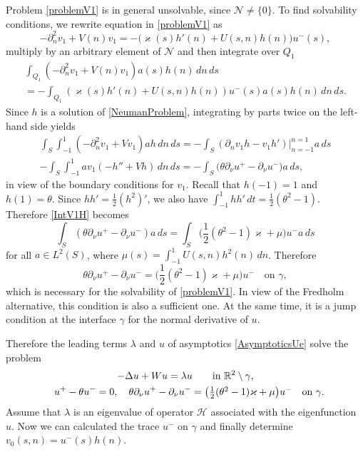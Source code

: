 \documentclass[reqno]{amsart}
\theoremstyle{plain}
\numberwithin{equation}{section}
\renewcommand{\kappa}{\varkappa}
\newcommand{\Real}{\mathbb R}
\newcommand{\cH}{\mathcal{H}}
\newcommand{\pte}{\partial_n}
\begin{document}
Problem \eqref{problemV1} is in general unsolvable, since $\mathcal{N}\neq\{0\}$.  To find solvabi\-li\-ty conditions, we rewrite  equation in \eqref{problemV1} as
\begin{equation}\label{eqnV1Expand}
  -\pte^2 v_1+V(n)v_1=-\big(\kappa(s)h'(n)+U(s,n)h(n)\big)u^-(s),
\end{equation}
multiply  by an arbitrary element of  $\mathcal{N}$  and then integrate over $Q_1$
\begin{multline}\label{IntV1H}
\int_{Q_1}\left(-\pte^2 v_1+V(n)v_1\right)a(s)h(n)\,dn\,ds
\\
=
-\int_{Q_1}(\kappa(s)h'(n)+U(s,n)h(n))u^-(s)a(s)h(n)\, dn\,ds.
\end{multline}
Since $h$ is a solution of \eqref{NeumanProblem}, integrating by parts twice on the left-hand side yields
\begin{multline*}
\int_{S} \int_{-1}^1\left(-\pte^2 v_1+Vv_1\right)a h\,dn \,ds
=-\int_{S}( \partial_n v_1 h-v_1 h')\big|_{n=-1}^{n=1}a\,ds\\-
\int_{S} \int_{-1}^1 a v_1\left(-h''+Vh\right)\,dn\,ds
=-\int_{S}\big(\theta\partial_\nu u^+-\partial_\nu u^-\big) a\,ds,
\end{multline*}
in view of the boundary conditions for $v_1$.
Recall that $h(-1)=1$ and $h(1)=\theta$.
Since $hh'=\frac12 (h^2)'$, we also have $\int_{-1}^1hh'\,d t=\textstyle\frac{1}{2 }(\theta^2-1)$.
Therefore \eqref{IntV1H} becomes
\begin{equation*}
\int_{S}\left(\theta\partial_\nu u^+-\partial_\nu u^-\right)a\,ds
=\int_{S}\big(\textstyle\frac{1}{2}(\theta^2-1)\kappa+\mu \big)u^-a\,ds
\end{equation*}
for all  $a\in L^2(S)$, where $\mu(s)=\int_{-1}^1 U(s,n)h^2(n)\, dn$.
Therefore
\begin{equation*}
  \theta\partial_\nu u^+-\partial_\nu u^-
=\big(\textstyle\frac{1}{2}(\theta^2-1)\kappa+\mu \big) u^-\quad\text {on }\gamma,
\end{equation*}
which is necessary for the solvability of \eqref{problemV1}.
In view of the Fredholm alternative, this condition is also a sufficient one. At the same time, it is a jump condition at the interface $\gamma$ for the normal derivative of $u$.

Therefore the leading terms $\lambda$ and $u$ of asymptotics \eqref{AsymptoticsUe} solve the problem
\begin{gather}\label{LimitProblemEq}
-\Delta u+Wu=\lambda u \qquad \hbox{in  } \Real^2\setminus \gamma,
\\ \label{RConds}
 \phantom{-}u^+-\theta u^-=0,  \quad
\theta\partial_\nu u^+-\partial_\nu u^-
=\big(\textstyle\frac{1}{2}(\theta^2-1)\kappa+\mu \big) u^- \quad \hbox{on } \gamma.
\end{gather}
Assume that $\lambda$ is an eigenvalue of operator $\cH$ associated with the eigenfunction~$u$. Now we can calculated the trace $u^-$ on $\gamma$ and  finally determine $v_0(s,n)=u^-(s)h(n)$.
\end{document}
